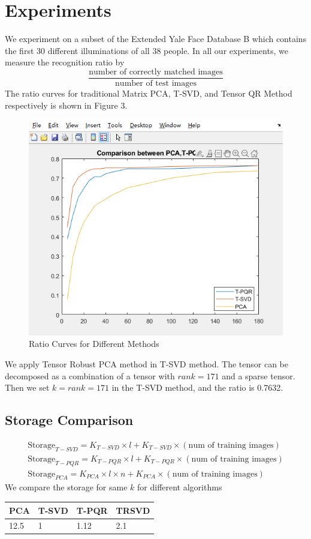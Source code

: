 \documentclass[english]{article}
\newcommand{\<}{\langle}
\renewcommand{\>}{\rangle}
\theoremstyle{definition}
\begin{document}
\section{Experiments}
We experiment on a subset of the Extended Yale Face Database B which contains the first 30 different illuminations of all 38 people.
In all our experiments, we measure the recognition ratio by
$$\frac{\text{number of correctly matched images}}{\text{number of test images}}$$
The ratio curves for traditional Matrix PCA, T-SVD, and Tensor QR Method respectively is shown in Figure 3. 
\begin{figure}[!h]
	\centering
	\includegraphics[scale=0.6]{all}
	\caption{Ratio Curves for Different Methods}
\end{figure}
We apply Tensor Robust PCA method in T-SVD method. The tensor can be decomposed as a combination of a tensor with $rank=171$ and a sparse tensor. Then we set $k=rank=171$ in the T-SVD method, and the ratio is 0.7632.
\subsection{Storage Comparison}
\begin{align*}
\text{Storage}_{T-SVD} = K_{T-SVD} \times  l + K_{T-SVD} \times (\text{num of training images})\\
\text{Storage}_{T-PQR} = K_{T-PQR} \times  l + K_{T-PQR} \times (\text{num of training images})\\
\text{Storage}_{PCA} = K_{PCA} \times  l \times n + K_{PCA} \times (\text{num of training images})
\end{align*}
We compare the storage for same $k$ for different algorithms
\begin{table}[H]
	\centering
	\begin{tabular}{llll}
		\hline
		PCA & T-SVD & T-PQR & TRSVD \\
		\hline
		12.5   & 1  & 1.12  & 2.1
	\end{tabular}
\end{table}
\end{document}
